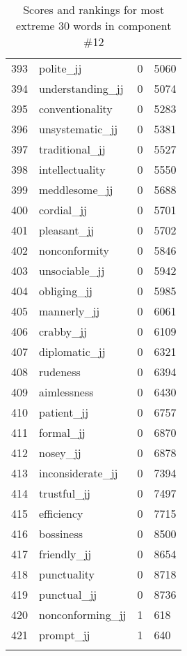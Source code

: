 \begin{longtable}[!htbp]{| rlr@{.}l |}
    393 & polite\_jj & 0 & 5060 \\
    394 & understanding\_jj & 0 & 5074 \\
    395 & conventionality & 0 & 5283 \\
    396 & unsystematic\_jj & 0 & 5381 \\
    397 & traditional\_jj & 0 & 5527 \\
    398 & intellectuality & 0 & 5550 \\
    399 & meddlesome\_jj & 0 & 5688 \\
    400 & cordial\_jj & 0 & 5701 \\
    401 & pleasant\_jj & 0 & 5702 \\
    402 & nonconformity & 0 & 5846 \\
    403 & unsociable\_jj & 0 & 5942 \\
    404 & obliging\_jj & 0 & 5985 \\
    405 & mannerly\_jj & 0 & 6061 \\
    406 & crabby\_jj & 0 & 6109 \\
    407 & diplomatic\_jj & 0 & 6321 \\
    408 & rudeness & 0 & 6394 \\
    409 & aimlessness & 0 & 6430 \\
    410 & patient\_jj & 0 & 6757 \\
    411 & formal\_jj & 0 & 6870 \\
    412 & nosey\_jj & 0 & 6878 \\
    413 & inconsiderate\_jj & 0 & 7394 \\
    414 & trustful\_jj & 0 & 7497 \\
    415 & efficiency & 0 & 7715 \\
    416 & bossiness & 0 & 8500 \\
    417 & friendly\_jj & 0 & 8654 \\
    418 & punctuality & 0 & 8718 \\
    419 & punctual\_jj & 0 & 8736 \\
    420 & nonconforming\_jj & 1 & 618 \\
    421 & prompt\_jj & 1 & 640 \\
    \hline
    \caption{Scores and rankings for most extreme 30 words in component \#12} \\
\end{longtable}
